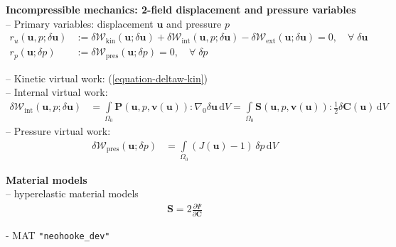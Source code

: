 \documentclass[a4paper,12pt]{report}
\newcommand{\bs}[1]{\boldsymbol{#1}}
\newcommand{\Om}{\mathit{\Omega}}
\begin{document}
\begin{itemize}
\end{itemize}

\textbf{Incompressible mechanics: 2-field displacement and pressure variables}\\

-- Primary variables: displacement $\bs{u}$ and pressure $p$
\begin{equation}
\label{equation-solid-weak-form-inc}
\begin{aligned}
r_u(\bs{u},p;\delta\bs{u}) &:= \delta \mathcal{W}_{\mathrm{kin}}(\bs{u};\delta\bs{u}) + \delta \mathcal{W}_{\mathrm{int}}(\bs{u},p;\delta\bs{u}) - \delta \mathcal{W}_{\mathrm{ext}}(\bs{u};\delta\bs{u}) = 0, \quad \forall \; \delta\bs{u} \\
r_p(\bs{u};\delta p) &:= \delta \mathcal{W}_{\mathrm{pres}}(\bs{u};\delta p) = 0, \quad \forall \; \delta p
\end{aligned}
\end{equation}

-- Kinetic virtual work: (\ref{equation-deltaw-kin})\\
-- Internal virtual work:
\begin{equation}
\label{equation-deltaw-int-inc}
\begin{aligned}
\delta \mathcal{W}_{\mathrm{int}}(\bs{u},p;\delta\bs{u}) &= \int\limits_{\Om_{0}} \bs{P}(\bs{u},p,\bs{v}(\bs{u})) : \nabla_{0} \delta\bs{u} \,\mathrm{d}V = \int\limits_{\Om_{0}} \bs{S}(\bs{u},p,\bs{v}(\bs{u})) : \frac{1}{2}\delta\bs{C}(\bs{u}) \,\mathrm{d}V
\end{aligned}
\end{equation}
-- Pressure virtual work:
\begin{equation}
\label{equation-deltaw-p}
\begin{aligned}
\delta \mathcal{W}_{\mathrm{pres}}(\bs{u};\delta p) &= \int\limits_{\Om_{0}} (J(\bs{u}) - 1) \,\delta p \,\mathrm{d}V 
\end{aligned}
\end{equation}


\textbf{Material models}\\
-- hyperelastic material models
\begin{equation}
\begin{aligned}
\bs{S} = 2\frac{\partial\mathit{\Psi}}{\partial \bs{C}}
\end{aligned}
\end{equation}

- MAT \verb."neohooke_dev".\\
\end{document}
